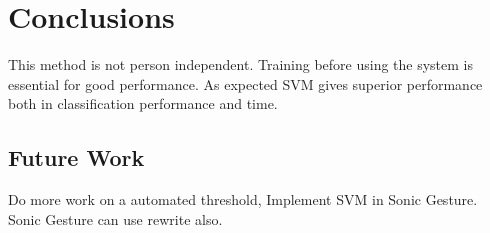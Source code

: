 
\chapter{Conclusions}
\label{ch:conc}


This method is not person independent. Training before using the system is essential for good performance. As expected SVM gives superior performance both in classification performance and time.


\section{Future Work}
Do more work on a automated threshold, Implement SVM in Sonic Gesture. Sonic Gesture can use rewrite also.
